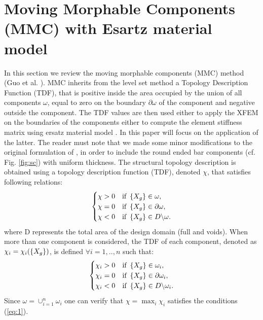 \section{Moving Morphable Components (MMC) with Esartz material model}
\label{MMC}
In this section we review the moving morphable components (MMC) method (Guo et al.  \cite{guo2014doing,guo2016explicit}).
 MMC inherits from the level set method \cite{allaire2004structural} a Topology Description Function (TDF), that is positive inside the area occupied by the union of all components $\omega$, equal to zero on the boundary $\partial \omega$ of the component and negative outside the component. The TDF values are then used either to apply the XFEM \cite{wei2010study} on the boundaries of the components either to compute the element stiffness matrix using ersatz material model \cite{zhang2016new}. In this paper will focus on the application of the latter. 
 The reader must note that we made some minor modifications to the original formulation of \cite{zhang2016new}, in order to include the round ended bar components (cf. Fig. \ref{fig:sc}) with uniform thickness.
The structural topology description is obtained using a topology description function (TDF), denoted $\chi$, that satisfies following relations:
\begin{equation}
\label{eq:1}
 \begin{cases}
              \chi >0 & \text{if } \left\{{X_g}\right\}\in \omega ,\\
               \chi =0  & \text{if } \left\{{X_g}\right\}\in \partial\omega,\\
               \chi <0 & \text{if } \left\{{X_g}\right\}\in D \backslash\omega.
          \end{cases}
\end{equation}
where D represents the total area of the design domain (full and voids). When more than one component is considered, the TDF of each component, denoted as $\chi_i=\chi_i(\left\{{X_g}\right\})$, is defined $ \forall i=1,..,n$ such that:
\begin{equation}
\label{eq:2}
 \begin{cases}
              \chi_i >0 & \text{if } \left\{{X_g}\right\}\in \omega_i ,\\
               \chi_i =0  & \text{if } \left\{{X_g}\right\}\in \partial\omega_i,\\
               \chi_i <0 & \text{if } \left\{{X_g}\right\}\in D \backslash\omega_i.
          \end{cases}
\end{equation}
Since $\omega=\cup_{i=1}^n{\omega_i}$ one can verify that $\chi=\max_{i}{\chi_i}$ satisfies the conditions (\ref{eq:1}).
